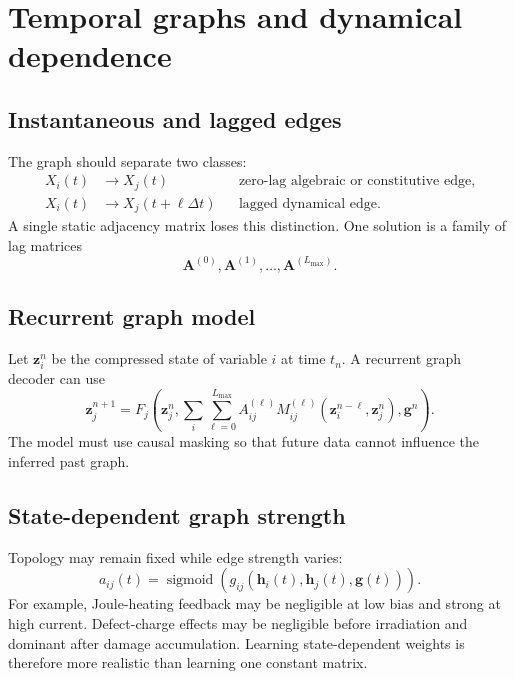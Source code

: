 \documentclass[11pt]{article}
\newcommand{\Amat}{\bm{A}}
\newcommand{\hvec}{\bm{h}}
\newcommand{\gvec}{\bm{g}}
\newcommand{\zvec}{\bm{z}}
\newcommand{\sigmoid}{\operatorname{sigmoid}}
\newcommand{\dt}{\Delta t}
\begin{document}
\section{Temporal graphs and dynamical dependence}

\subsection{Instantaneous and lagged edges}

The graph should separate two classes:
\begin{align}
X_i(t)&\rightarrow X_j(t) &&\text{zero-lag algebraic or constitutive edge},\\
X_i(t)&\rightarrow X_j(t+\ell\dt) &&\text{lagged dynamical edge}.
\end{align}
A single static adjacency matrix loses this distinction. One solution is a family of lag matrices
\begin{equation}
\Amat^{(0)},\Amat^{(1)},\ldots,\Amat^{(L_{\max})}.
\end{equation}

\subsection{Recurrent graph model}

Let \(\zvec_i^n\) be the compressed state of variable \(i\) at time \(t_n\). A recurrent graph decoder can use
\begin{equation}
\zvec_j^{n+1}=F_j\left(\zvec_j^n,\sum_i\sum_{\ell=0}^{L_{\max}}A_{ij}^{(\ell)}M_{ij}^{(\ell)}(\zvec_i^{n-\ell},\zvec_j^n),\gvec^n\right).
\label{eq:temporal_graph_decoder}
\end{equation}
The model must use causal masking so that future data cannot influence the inferred past graph.

\subsection{State-dependent graph strength}

Topology may remain fixed while edge strength varies:
\begin{equation}
a_{ij}(t)=\sigmoid\left(g_{ij}(\hvec_i(t),\hvec_j(t),\gvec(t))\right).
\end{equation}
For example, Joule-heating feedback may be negligible at low bias and strong at high current. Defect-charge effects may be negligible before irradiation and dominant after damage accumulation. Learning state-dependent weights is therefore more realistic than learning one constant matrix.
\end{document}
